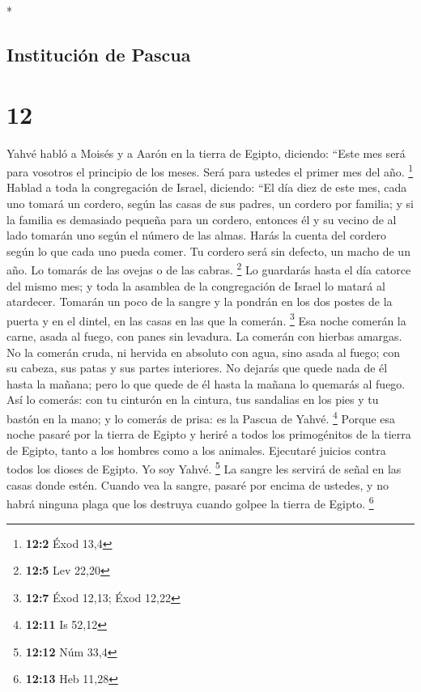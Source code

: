 \begin{paracol}{2}
\switchcolumn[0]*

\hypertarget{instituciuxf3n-de-pascua}{%
\subsection{Institución de Pascua}\label{instituciuxf3n-de-pascua}}

\hypertarget{section-22}{%
\section{12}\label{section-22}}

 Yahvé habló a Moisés y a Aarón en la tierra de Egipto,
diciendo:  ``Este mes será para vosotros el principio de
los meses. Será para ustedes el primer mes del año. \footnote{\textbf{12:2}
  Éxod 13,4}  Hablad a toda la congregación de Israel,
diciendo: ``El día diez de este mes, cada uno tomará un cordero, según
las casas de sus padres, un cordero por familia;  y si la
familia es demasiado pequeña para un cordero, entonces él y su vecino de
al lado tomarán uno según el número de las almas. Harás la cuenta del
cordero según lo que cada uno pueda comer.  Tu cordero
será sin defecto, un macho de un año. Lo tomarás de las ovejas o de las
cabras. \footnote{\textbf{12:5} Lev 22,20}  Lo guardarás
hasta el día catorce del mismo mes; y toda la asamblea de la
congregación de Israel lo matará al atardecer.  Tomarán un
poco de la sangre y la pondrán en los dos postes de la puerta y en el
dintel, en las casas en las que la comerán. \footnote{\textbf{12:7} Éxod
  12,13; Éxod 12,22}  Esa noche comerán la carne, asada al
fuego, con panes sin levadura. La comerán con hierbas amargas.
 No la comerán cruda, ni hervida en absoluto con agua,
sino asada al fuego; con su cabeza, sus patas y sus partes interiores.
 No dejarás que quede nada de él hasta la mañana; pero lo
que quede de él hasta la mañana lo quemarás al fuego. 
Así lo comerás: con tu cinturón en la cintura, tus sandalias en los pies
y tu bastón en la mano; y lo comerás de prisa: es la Pascua de Yahvé.
\footnote{\textbf{12:11} Is 52,12}  Porque esa noche
pasaré por la tierra de Egipto y heriré a todos los primogénitos de la
tierra de Egipto, tanto a los hombres como a los animales. Ejecutaré
juicios contra todos los dioses de Egipto. Yo soy Yahvé. \footnote{\textbf{12:12}
  Núm 33,4}  La sangre les servirá de señal en las casas
donde estén. Cuando vea la sangre, pasaré por encima de ustedes, y no
habrá ninguna plaga que los destruya cuando golpee la tierra de Egipto.
\footnote{\textbf{12:13} Heb 11,28}


\end{paracol}
